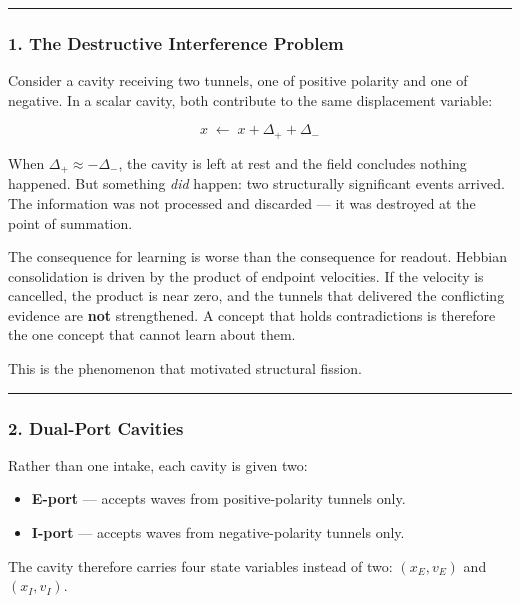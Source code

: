 \documentclass[
  11pt,
  a4paper,
]{article}
\providecommand{\tightlist}{%
  \setlength{\itemsep}{0pt}\setlength{\parskip}{0pt}}
\begin{document}
\begin{center}\rule{0.5\linewidth}{0.5pt}\end{center}

\subsubsection{1. The Destructive Interference
Problem}\label{the-destructive-interference-problem}

Consider a cavity receiving two tunnels, one of positive polarity and
one of negative. In a scalar cavity, both contribute to the same
displacement variable:

\[
x \;\leftarrow\; x + \Delta_{+} + \Delta_{-}
\]

When \(\Delta_{+} \approx -\Delta_{-}\), the cavity is left at rest and
the field concludes nothing happened. But something \emph{did} happen:
two structurally significant events arrived. The information was not
processed and discarded --- it was destroyed at the point of summation.

The consequence for learning is worse than the consequence for readout.
Hebbian consolidation is driven by the product of endpoint velocities.
If the velocity is cancelled, the product is near zero, and the tunnels
that delivered the conflicting evidence are \textbf{not} strengthened. A
concept that holds contradictions is therefore the one concept that
cannot learn about them.

This is the phenomenon that motivated structural fission.

\begin{center}\rule{0.5\linewidth}{0.5pt}\end{center}

\subsubsection{2. Dual-Port Cavities}\label{dual-port-cavities}

Rather than one intake, each cavity is given two:

\begin{itemize}
\tightlist
\item
  \textbf{E-port} --- accepts waves from positive-polarity tunnels only.
\item
  \textbf{I-port} --- accepts waves from negative-polarity tunnels only.
\end{itemize}

The cavity therefore carries four state variables instead of two:
\((x_E, v_E)\) and \((x_I, v_I)\).
\end{document}
